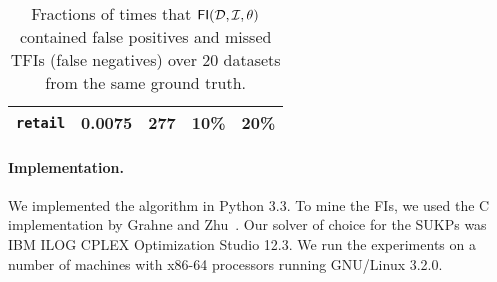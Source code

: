 \begin{table}[tbp]
\begin{tabular}{llrrr}
\midrule
\texttt{retail} & 0.0075 & 277 & 10\% & 20\% \\
\bottomrule
\end{tabular}
\caption{Fractions of times that $\mathsf{FI}({\cal D},{\cal I},\theta)$ contained false positives
and missed TFIs (false negatives) over 20 datasets from the same ground truth.}
\label{table:fp}
\end{table}


\paragraph*{Implementation.}
We implemented the algorithm in Python 3.3. %
To mine the FIs, we used the C implementation by Grahne
and Zhu~\citep{GrahneZ03}. %
Our solver of choice for the SUKPs was IBM\textsuperscript{\textregistered}
ILOG\textsuperscript{\textregistered} CPLEX\textsuperscript{\textregistered}
Optimization Studio 12.3. %
We run the experiments on a number of machines with x86-64 processors running
GNU/Linux 3.2.0.

